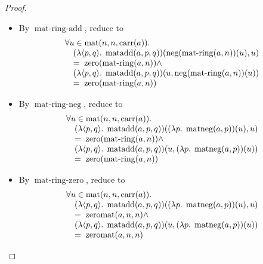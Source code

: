 \documentclass[11pt]{article}
\theoremstyle{plain}
\begin{document}
\begin{proof}
\begin{itemize}[leftmargin=2.8em, itemsep=4pt, parsep=1pt]
  \item[\textbf{76}] By $\operatorname{mat\text{-}ring\text{-}add}$, reduce to
\begin{equation*}
\begin{array}{@{}l@{}} \forall u \in \operatorname{mat}(n, n, \operatorname{carr}(a)). \\ \quad (\lambda \langle p, q \rangle.\; \operatorname{matadd}(a, p, q))(\operatorname{neg}(\operatorname{mat\text{-}ring}(a, n))(u), u) \\ \quad =\; \operatorname{zero}(\operatorname{mat\text{-}ring}(a, n)) \wedge \\ \quad (\lambda \langle p, q \rangle.\; \operatorname{matadd}(a, p, q))(u, \operatorname{neg}(\operatorname{mat\text{-}ring}(a, n))(u)) \\ \quad =\; \operatorname{zero}(\operatorname{mat\text{-}ring}(a, n)) \end{array}
\end{equation*}

  \item[\textbf{77}] By $\operatorname{mat\text{-}ring\text{-}neg}$, reduce to
\begin{equation*}
\begin{array}{@{}l@{}} \forall u \in \operatorname{mat}(n, n, \operatorname{carr}(a)). \\ \quad (\lambda \langle p, q \rangle.\; \operatorname{matadd}(a, p, q))((\lambda p.\; \operatorname{matneg}(a, p))(u), u) \\ \quad =\; \operatorname{zero}(\operatorname{mat\text{-}ring}(a, n)) \wedge \\ \quad (\lambda \langle p, q \rangle.\; \operatorname{matadd}(a, p, q))(u, (\lambda p.\; \operatorname{matneg}(a, p))(u)) \\ \quad =\; \operatorname{zero}(\operatorname{mat\text{-}ring}(a, n)) \end{array}
\end{equation*}

  \item[\textbf{78}] By $\operatorname{mat\text{-}ring\text{-}zero}$, reduce to
\begin{equation*}
\begin{array}{@{}l@{}} \forall u \in \operatorname{mat}(n, n, \operatorname{carr}(a)). \\ \quad (\lambda \langle p, q \rangle.\; \operatorname{matadd}(a, p, q))((\lambda p.\; \operatorname{matneg}(a, p))(u), u) \\ \quad =\; \operatorname{zeromat}(a, n, n) \wedge \\ \quad (\lambda \langle p, q \rangle.\; \operatorname{matadd}(a, p, q))(u, (\lambda p.\; \operatorname{matneg}(a, p))(u)) \\ \quad =\; \operatorname{zeromat}(a, n, n) \end{array}
\end{equation*}


\end{itemize}
\end{proof}
\end{document}
